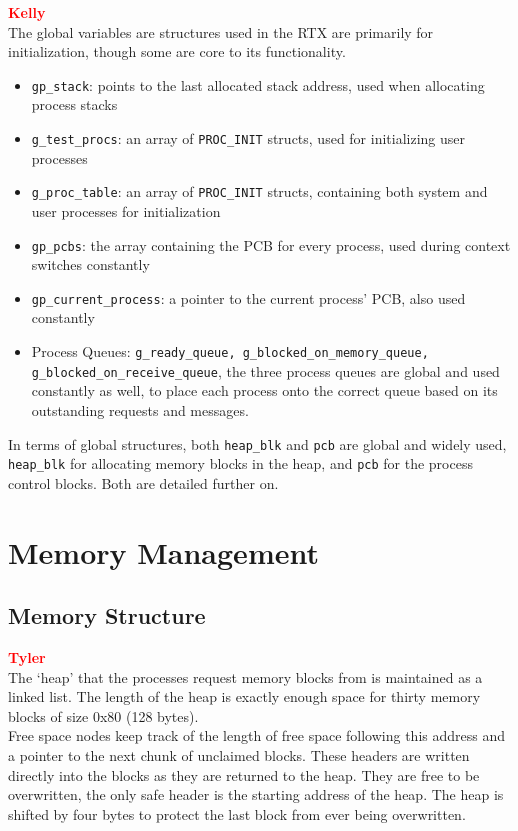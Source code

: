 \documentclass[12pt]{report}
\begin{document}
\textcolor{red}{\textbf{Kelly}} \\
The global variables are structures used in the RTX are primarily for initialization, though
some are core to its functionality.
\begin{itemize}
	\item \texttt{gp_stack}: points to the last allocated stack address, used when allocating process stacks
	\item \texttt{g_test_procs}: an array of \texttt{PROC_INIT} structs, used for initializing user processes
	\item \texttt{g_proc_table}: an array of \texttt{PROC_INIT} structs, containing both system and user processes for initialization
	\item \texttt{gp_pcbs}: the array containing the PCB for every process, used during context switches constantly
	\item \texttt{gp_current_process}: a pointer to the current process' PCB, also used constantly
	\item Process Queues: \texttt{g_ready_queue, g_blocked_on_memory_queue, g_blocked_on_receive_queue},
		the three process queues are global and used constantly as well, to place each process
		onto the correct queue based on its outstanding requests and messages.
\end{itemize}
In terms of global structures, both \texttt{heap_blk} and \texttt{pcb} are global
and widely used, \texttt{heap_blk} for allocating memory blocks in the heap, and
\texttt{pcb} for the process control blocks. Both are detailed further on.

\section{Memory Management}

\subsection{Memory Structure}

\textcolor{red}{\textbf{Tyler}} \\
The `heap' that the processes request memory blocks from is maintained as a linked list. The length of the heap is exactly enough space for thirty memory blocks of size 0x80 (128 bytes).\\

Free space nodes keep track of the length of free space following this address and a pointer to the next chunk of unclaimed blocks. These headers are written directly into the blocks as they are returned to the heap. They are free to be overwritten, the only safe header is the starting address of the heap. The heap is shifted by four bytes to protect the last block from ever being overwritten. \\
\end{document}
